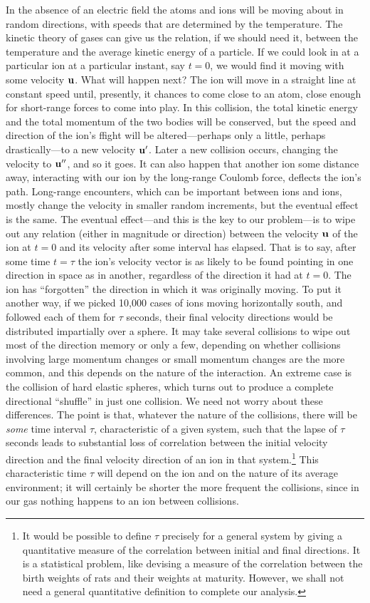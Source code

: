 In the absence of an electric field the atoms and ions will be moving
about in random directions, with speeds that are determined by
the temperature. The kinetic theory of gases can give us the relation,
if we should need it, between the temperature and the average
kinetic energy of a particle. If we could look in at a particular ion
at a particular instant, say $t = 0$, we would find it moving with some
velocity $\mathbf{u}$. What will happen next? The ion will move in a straight
line at constant speed until, presently, it chances to come close to an
atom, close enough for short-range forces to come into play. In this
collision, the total kinetic energy and the total momentum of the two
bodies will be conserved, but the speed and direction of the ion's
ffight will be altered---perhaps only a little, perhaps drastically---to
a new velocity $\mathbf{u}'$. Later a new collision occurs, changing the velocity
to $\mathbf{u}''$, and so it goes. It can also happen that another ion some distance
away, interacting with our ion by the long-range Coulomb
force, deflects the ion's path. Long-range encounters, which can be
important between ions and ions, mostly change the velocity in
smaller random increments, but the eventual effect is the same.
The eventual effect---and this is the key to our problem---is to wipe
out any relation (either in magnitude or direction) between the
velocity $\mathbf{u}$ of the ion at $t = 0$ and its velocity after some interval has
elapsed. That is to say, after some time $t = \tau$ the ion's velocity vector
is as likely to be found pointing in one direction in space as in
another, regardless of the direction it had at $t = 0$. The ion has
``forgotten'' the direction in which it was originally moving. To put
it another way, if we picked 10,000 cases of ions moving horizontally
south, and followed each of them for $\tau$ seconds, their final velocity
directions would be distributed impartially over a sphere. It may
take several collisions to wipe out most of the direction memory or
only a few, depending on whether collisions involving large momentum
changes or small momentum changes are the more common,
and this depends on the nature of the interaction. An extreme case
is the collision of hard elastic spheres, which turns out to produce a
complete directional ``shuffle'' in just one collision. We need not
worry about these differences. The point is that, whatever the nature
of the collisions, there will be \emph{some} time interval $\tau$, characteristic of
a given system, such that the lapse of $\tau$ seconds leads to substantial
loss of correlation between the initial velocity direction and the final
velocity direction of an ion in that
system.\footnote{It would be possible to define $\tau$ precisely for a general system by giving a quantitative
measure of the correlation between initial and final directions. It is a statistical 
problem, like devising a measure of the correlation between the birth weights of rats and
their weights at maturity. However, we shall not need a general quantitative definition
to complete our analysis.
} This characteristic time
$\tau$ will depend on the ion and on the nature of its average environment;
it will certainly be shorter the more frequent the collisions,
since in our gas nothing happens to an ion between collisions.

